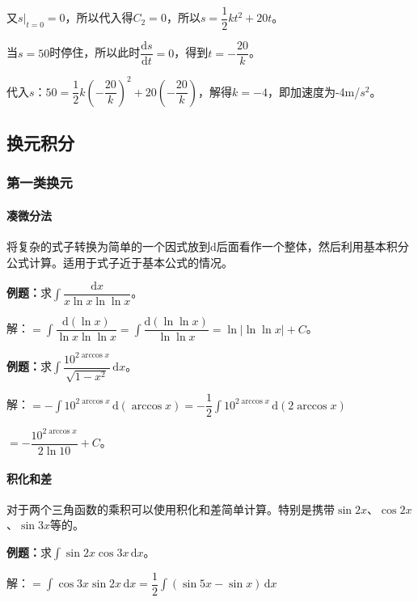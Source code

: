 \documentclass[UTF8, 12pt]{ctexart}
\begin{document}
又$s\vert_{t=0}=0$，所以代入得$C_2=0$，所以$s=\dfrac{1}{2}kt^2+20t$。

当$s=50$时停住，所以此时$\dfrac{\textrm{d}s}{\textrm{d}t}=0$，得到$t=-\dfrac{20}{k}$。

代入$s$：$50=\dfrac{1}{2}k\left(-\dfrac{20}{k}\right)^2+20\left(-\dfrac{20}{k}\right)$，解得$k=-4$，即加速度为-4m/$s^2$。

\subsection{换元积分}

\subsubsection{第一类换元}

\paragraph{凑微分法} \leavevmode \medskip

将复杂的式子转换为简单的一个因式放到$\textrm{d}$后面看作一个整体，然后利用基本积分公式计算。适用于式子近于基本公式的情况。

\textbf{例题：}求$\displaystyle{\int\dfrac{\textrm{d}x}{x\ln x\ln\ln x}}$。 \medskip

解：$=\displaystyle{\int\dfrac{\textrm{d}(\ln x)}{\ln x\ln\ln x}}=\displaystyle{\int\dfrac{\textrm{d}(\ln\ln x)}{\ln\ln x}}=\ln\vert\ln\ln x\vert+C$。\medskip

\textbf{例题：}求$\displaystyle{\int\dfrac{10^{2\arccos x}}{\sqrt{1-x^2}}\,\textrm{d}x}$。

解：$=-\displaystyle{\int10^{2\arccos x}\,\textrm{d}(\arccos x)}=-\dfrac{1}{2}\displaystyle{\int10^{2\arccos x}\,\textrm{d}(2\arccos x)}$

$=-\dfrac{10^{2\arccos x}}{2\ln10}+C$。

\paragraph{积化和差} \leavevmode \medskip

对于两个三角函数的乘积可以使用积化和差简单计算。特别是携带$\sin2x$、$\cos2x$、$\sin3x$等的。

\textbf{例题：}求$\displaystyle{\int\sin2x\cos3x\,\textrm{d}x}$。

解：$=\displaystyle{\int\cos3x\sin2x\,\textrm{d}x=\dfrac{1}{2}\int(\sin5x-\sin x)\,\textrm{d}x}$
\end{document}
